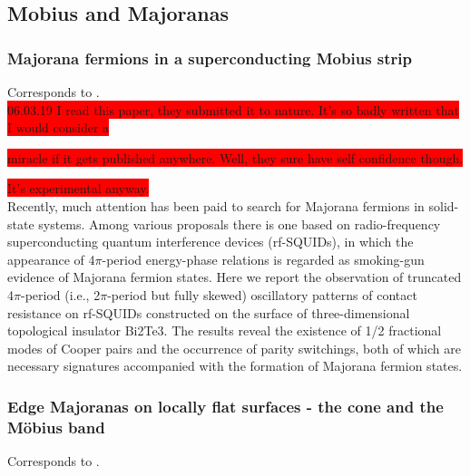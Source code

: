 \subsection{Mobius and Majoranas}

\subsubsection{Majorana fermions in a superconducting Mobius strip}

Corresponds to \cite{2016Pang}.\\

\colorbox{red}{06.03.19 I read this paper, they submitted it to nature. It's so badly written that I would consider a}

\colorbox{red}{miracle if it gets published anywhere. Well, they sure have self confidence though.}

\colorbox{red}{It's experimental anyway.}\\

Recently, much attention has been paid to search for Majorana fermions in solid-state systems. Among various proposals there is one based on radio-frequency superconducting quantum interference devices (rf-SQUIDs), in which the appearance of 4$\pi$-period energy-phase relations is regarded as smoking-gun evidence of Majorana fermion states. Here we report the observation of truncated 4$\pi$-period (i.e., 2$\pi$-period but fully skewed) oscillatory patterns of contact resistance on rf-SQUIDs constructed on the surface of three-dimensional topological insulator Bi2Te3. The results reveal the existence of 1/2 fractional modes of Cooper pairs and the occurrence of parity switchings, both of which are necessary signatures accompanied with the formation of Majorana fermion states. 

\subsubsection{Edge Majoranas on locally flat surfaces - the cone and the Möbius band}

Corresponds to \cite{2016Quelle}.\\


